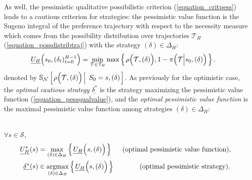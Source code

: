 As well, the pessimistic qualitative possibilistic criterion (\ref{equation_critpess})
leads to a cautious criterion for strategies: 
the pessimistic value function is
the Sugeno integral of the preference trajectory 
with respect to the necessity measure
which comes from the possibility distribution over trajectories $\mathcal{T}_H$ (\ref{equation_possdistribtraj}) 
with the strategy $(\delta) \in \Delta_H$:
\begin{align} 
 \underline{U_H} \Big( s_0,(\delta_t)_{t=0}^{H-1} \Big) &= \min_{\mathcal{T} \in \mathcal{T}_H} \max \left\{ \left.  \rho \Big( \mathcal{T},  (\delta) \Big), 1 - \pi \Big( \mathcal{T} \Big\vert s_0, (\delta) \Big)  \right. \right\}. \label{equation_pessqualvalue}
\end{align}
denoted by $\mathbb{S}_{\mathcal{N}} \left[ \left.  \rho \Big( \mathcal{T},  (\delta) \Big) \, \right| \left. \, S_0 = s, (\delta)  \right. \right]$.
As previously for the optimistic case,
the \textit{optimal cautious strategy} $\underline{\delta^*}$ is the strategy
maximizing the pessimistic value function (\ref{equation_pessqualvalue}),
and the \textit{optimal pessimistic value function}
 is the maximal pessimistic value function among strategies $(\delta) \in \Delta_H$:
\\
\\

\begin{Def}
$\forall s \in \mathcal{S}$,
\begin{align} 
\label{equation_pessqualvaluestar} \underline{U_H^*}(s) &= \max_{(\delta) \in \Delta_H} \left\{ \left.  \underline{U_H} \Big(s,(\delta)\Big)  \right. \right\} & \mbox{ (optimal pessimistic value function), } \\
\label{equation_pessqualstratstar} \underline{\delta^*}(s) &\in \operatorname*{argmax}_{(\delta) \in \Delta_H} \left\{ \left.  \underline{U_H} \Big(s,(\delta)\Big)  \right. \right\} & \mbox{ (optimal pessimistic strategy). } 
\end{align}
\end{Def}





